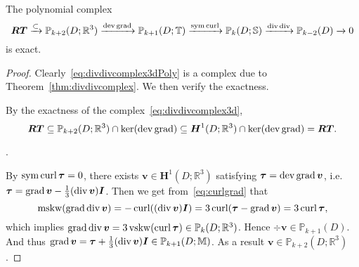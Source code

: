 \begin{lemma}
The polynomial complex
\begin{equation}\label{eq:divdivcomplex3dPoly}
\boldsymbol{RT}\xrightarrow{\subset} \mathbb P_{k+2}(D; \mathbb R^3)\xrightarrow{\operatorname{dev}\operatorname{grad}}\mathbb P_{k+1}(D; \mathbb T)\xrightarrow{\operatorname{sym}\operatorname{curl}} \mathbb P_k(D; \mathbb S) \xrightarrow{\operatorname{div}{\operatorname{div}}} \mathbb P_{k-2}(D)\xrightarrow{}0
\end{equation}
is exact.
\end{lemma}
\begin{proof}
Clearly~\eqref{eq:divdivcomplex3dPoly} is a complex due to Theorem~\ref{thm:divdivcomplex}.
We then verify the exactness.

\medskip
{} By the exactness of the complex~\eqref{eq:divdivcomplex3d}, 
\[
\boldsymbol{RT}\subseteq\mathbb P_{k+2}(D; \mathbb R^3) \cap\ker(\operatorname{dev}\operatorname{grad})\subseteq\boldsymbol H^1(D;\mathbb R^3) \cap\ker(\operatorname{dev}\operatorname{grad})=\boldsymbol{RT}.
\]

\medskip
{}. 


By $\operatorname{sym}\operatorname{curl}\boldsymbol \tau = 0$, there exists $\boldsymbol v\in\boldsymbol H^1(D; \mathbb R^3)$ satisfying $\boldsymbol\tau=\operatorname{dev}\operatorname{grad}\boldsymbol v$, i.e. $\boldsymbol\tau=\operatorname{grad}\boldsymbol v-\frac{1}{3}(\operatorname{div}\boldsymbol v)\boldsymbol I$. Then we get from~\eqref{eq:curlgrad} that
\[
\mskw(\grad\div\boldsymbol v)=-\curl((\div\boldsymbol v)\boldsymbol I)=3\curl(\boldsymbol\tau-\grad\boldsymbol v)=3\curl\boldsymbol\tau, %
\]
which implies $\operatorname{grad}\operatorname{div}\boldsymbol v=3\operatorname{vskw}(\operatorname{curl}\boldsymbol\tau)\in\mathbb P_{k}(D; \mathbb R^3)$. Hence
$\div\boldsymbol v\in\mathbb P_{k+1}(D)$. And thus $\operatorname{grad}\boldsymbol v=\boldsymbol\tau+\frac{1}{3}(\operatorname{div}\boldsymbol v)\boldsymbol I\in\mathbb P_{k+1}(D; \mathbb M)$. As a result $\boldsymbol v\in\mathbb P_{k+2}(D; \mathbb R^3)$. 


\end{proof}
